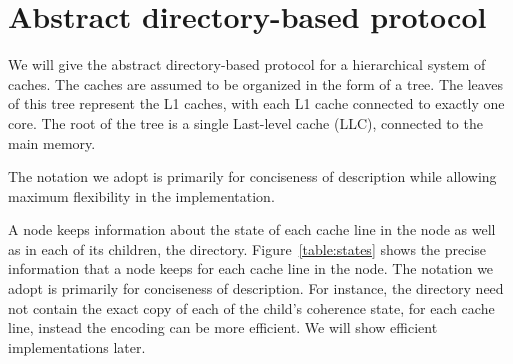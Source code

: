 \section{Abstract directory-based protocol}

\label{sec:abstract}

\newcommand{\One}[2]{\text{#1$\langle#2\rangle$}}
\newcommand{\two}[3]{\text{#1$\langle#2,#3\rangle$}}
\newcommand{\three}[4]{\text{#1$\langle#2,#3,#4\rangle$}}
\newcommand{\four}[5]{\text{#1$\langle#2,#3,#4,#5\rangle$}}
\newcommand{\True}{\texttt{True}}
\newcommand{\False}{\texttt{False}}
\newcommand{\assigns}{:=}
\newcommand{\AndAnd}{\;\&\&\;}
\newcommand{\OrOr}{\;||\;}
\newcommand{\Inv}{\text{$Inv$}}


We will give the abstract directory-based protocol for a hierarchical system of
caches. The caches are assumed to be organized in the form of a tree. The leaves
of this tree represent the L1 caches, with each L1 cache connected to exactly
one core. The root of the tree is a single Last-level cache (LLC), connected to
the main memory.

The notation we adopt is primarily for conciseness of description while allowing
maximum flexibility in the implementation.

A node keeps information about the state of each cache line in the node as well
as in each of its children, \ie the directory. Figure~\ref{table:states} shows
the precise information that a node keeps for each cache line in the node. The
notation we adopt is primarily for conciseness of description. For instance, the
directory need not contain the exact copy of each of the child's coherence
state, for each cache line, instead the encoding can be more efficient. We will
show efficient implementations later.

